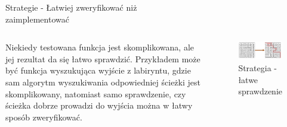 \begin{frame}{Strategie - Łatwiej zweryfikować niż\\zaimplementować}
    \begin{columns}[t]
            Niekiedy testowana funkcja jest skomplikowana, ale jej rezultat da się łatwo sprawdzić. Przykładem może być funkcja wyszukująca wyjście z labiryntu, gdzie sam algorytm wyszukiwania odpowiedniej ścieżki jest skomplikowany, 
            natomiast samo sprawdzenie, czy ścieżka dobrze prowadzi do wyjścia można w łatwy sposób zweryfikować.
        \centering
        \begin{figure}
            \centering
            \includegraphics[width=1\textwidth]{images/property_easy_verification.png}
            \caption{Strategia - łatwe sprawdzenie}
            \label{fig:easy_verification_strategy}
        \end{figure}    
    \end{columns}
\end{frame}


